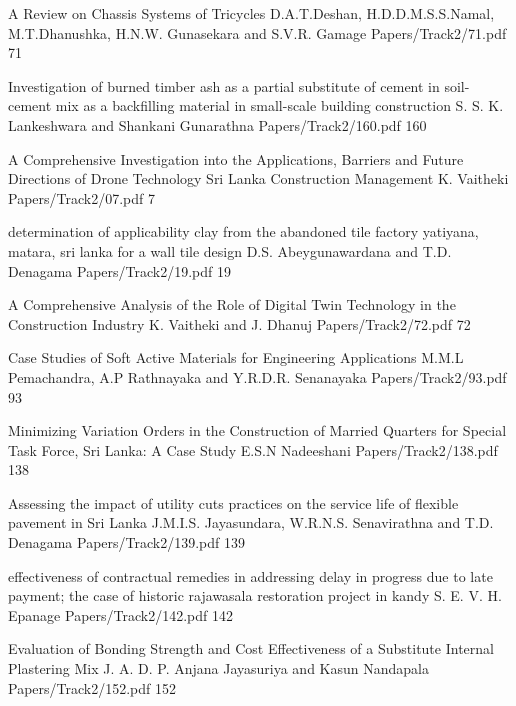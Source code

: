    \addpaper
{A Review on Chassis Systems of Tricycles}
 {D.A.T.Deshan, H.D.D.M.S.S.Namal, M.T.Dhanushka, H.N.W. Gunasekara
and S.V.R. Gamage} 
 {Papers/Track2/71.pdf}
   {71} 


\addpaper
{Investigation of burned timber ash as a partial substitute of cement in soil-cement mix as a backfilling material in small-scale building construction}
{S. S. K. Lankeshwara and Shankani Gunarathna}
{Papers/Track2/160.pdf}
{160}


\addpaper
{A Comprehensive Investigation into the Applications, Barriers and Future Directions of Drone Technology Sri Lanka Construction Management}
{K. Vaitheki}
{Papers/Track2/07.pdf}
{7}




\addpaper
{determination of applicability clay from the abandoned tile factory yatiyana, matara, sri lanka for a wall tile design}
{D.S. Abeygunawardana and T.D. Denagama}
{Papers/Track2/19.pdf}
{19}


\addpaper
{A Comprehensive Analysis of the Role of Digital Twin Technology in the Construction Industry}
{K. Vaitheki and J. Dhanuj}
{Papers/Track2/72.pdf}
{72}


   \addpaper
{Case Studies of Soft Active Materials for Engineering Applications}
 {M.M.L Pemachandra, A.P Rathnayaka and Y.R.D.R. Senanayaka} 
 {Papers/Track2/93.pdf}
   {93} 




\addpaper
{Minimizing Variation Orders in the Construction of Married Quarters for Special Task Force, Sri Lanka: A Case Study}
{E.S.N Nadeeshani}
{Papers/Track2/138.pdf}
{138}


\addpaper
{Assessing the impact of utility cuts practices on the service life of flexible pavement in Sri Lanka}
{J.M.I.S. Jayasundara, W.R.N.S. Senavirathna and T.D. Denagama}
{Papers/Track2/139.pdf}
{139}


   \addpaper
{effectiveness of contractual remedies in addressing delay in progress due to late payment; the case of historic rajawasala restoration project in kandy}
 {S. E. V. H. Epanage} 
 {Papers/Track2/142.pdf}
   {142} 


\addpaper
{Evaluation of Bonding Strength and Cost Effectiveness of a Substitute Internal Plastering Mix}
{J. A. D. P. Anjana Jayasuriya and Kasun Nandapala}
{Papers/Track2/152.pdf}
{152}


